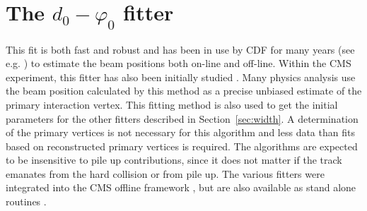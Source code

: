 \documentclass{cmspaper}
\begin{document}
\section{\label{sec:dphi}The $d_0-\varphi_0$ fitter}

This fit is both fast and robust and has been in use by CDF for many years (see e.g. \cite{NIM}) to estimate the beam positions both on-line 
and off-line. Within the CMS experiment, this fitter has also been initially studied \cite{oldCMSnote}.
Many physics analysis use the beam position calculated 
by this method as a precise unbiased estimate of the primary interaction vertex. 
This fitting method is also used to get the initial parameters for the other fitters described in Section~\ref{sec:width}.
A determination of the primary vertices 
is not necessary for this algorithm and less data than fits based on reconstructed primary vertices is required. The algorithms are expected to be insensitive to 
pile up contributions, since it does not matter if the track emanates from the hard collision or from pile up.
The various fitters were integrated into the CMS offline framework 
\cite{BeamSpotProducer}, but are also available as stand alone routines \cite{CVS}. 
\end{document}
